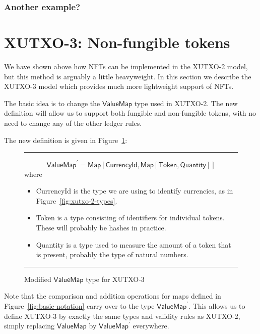 \documentclass[a4paper]{article}
\newcommand{\s}{\textsf}  %
\theoremstyle{definition}  %
\newcommand\rfskip{7pt}
\newenvironment{ruledfigure}[1]{\begin{figure}[#1]\hrule\vspace{\rfskip}}{\vspace{\rfskip}\hrule\end{figure}}
\newcommand{\Map}[2]{\ensuremath{\s{Map}[#1,#2]}}
\newcommand{\valuemap}{\ensuremath{\s{ValueMap}}}
\newcommand{\newvaluemap}{\ensuremath{\s{ValueMap}^{\prime}}}
\begin{document}
\subsubsection{Another example?}
  
\section{XUTXO-3: Non-fungible tokens}
\label{sec:xutxo-3}

We have shown above how NFTs can be implemented in the XUTXO-2 model,
but this method is arguably a little heavyweight.  In this section we
describe the XUTXO-3 model which provides much more lightweight
support of NFTs.

The basic idea is to change the \valuemap{} type used in XUTXO-2.  The
new definition will allow us to support both fungible and non-fungible
tokens, with no need to change any of the other ledger rules.

The new definition is given in Figure~\ref{fig:xutxo-3-types}:

\begin{ruledfigure}{H}
  \[
  \newvaluemap = \Map{\s{CurrencyId}}{\Map{\s{Token}}{\s{Quantity}}}
  \]
  where
  \begin{itemize}
\item \s{CurrencyId} is the type we are using to identify currencies, as in Figure~\ref{fig:xutxo-2-types}.
\item \s{Token} is a type consisting of identifiers for individual
  tokens.  These will probably be hashes in practice.
\item \s{Quantity} is a type used to measure the amount of a token
  that is present, probably the type of natural numbers.
  \end{itemize}
  \caption{Modified \valuemap{} type for XUTXO-3}
  \label{fig:xutxo-3-types}
\end{ruledfigure}

\noindent Note that the comparison and addition operations for maps defined in
Figure~\ref{fig:basic-notation} carry over to the type \newvaluemap.
This allows us to define XUTXO-3 by exactly the same types and
validity rules as XUTXO-2, simply replacing \valuemap{} by
\newvaluemap{} everywhere.
\end{document}
